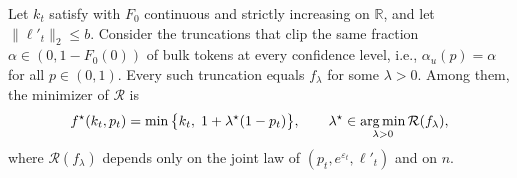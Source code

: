 \begin{theorem}
\label{thm:cis_formal}
Let $k_t$ satisfy  with $F_0$ continuous and
strictly increasing on $\mathbb R$, and let $\|\ell'_t\|_2\le b$. Consider the
truncations that clip the same fraction $\alpha\in(0,1-F_0(0))$ of bulk tokens
at every confidence level, i.e., $\alpha_u(p)=\alpha$ for all $p\in(0,1)$.
Every such truncation equals $f_\lambda$ for some $\lambda>0$. Among them, the
minimizer of $\mathcal R$ is
\begin{equation}
f^\star(k_t,p_t)=\min\big\{k_t,\;1+\lambda^\star(1-p_t)\big\},
\qquad
\lambda^\star\in\operatorname*{arg\,min}_{\lambda>0}\mathcal R(f_\lambda),
\label{eq:cis_formal}
\end{equation}
where $\mathcal R(f_\lambda)$ depends only on the joint law of
$(p_t,e^{\varepsilon_t},\ell'_t)$ and on $n$.
\end{theorem}

